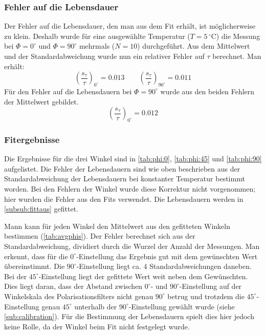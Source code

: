 \subsubsection{Fehler auf die Lebensdauer}
Der Fehler auf die Lebensdauer, den man aus dem Fit erhält, ist möglicherweise zu klein. Deshalb wurde für eine ausgewählte Temperatur ($T=5\,{}^\circ$C) 
die Messung bei $\Phi=0^\circ$ und $\Phi=90^\circ$ mehrmals ($N=10$) durchgeführt. Aus dem Mittelwert und der Standardabweichung wurde 
nun ein relativer Fehler auf $\tau$ berechnet. Man erhält:
\begin{equation}
  \label{eq:error:tau:0_90}
  \left( \frac{s_\tau}{\tau} \right)_{0^\circ} = 0.013 \qquad \left( \frac{s_\tau}{\tau} \right)_{90^\circ} = 0.011
\end{equation}
Für den Fehler auf die Lebensdauern bei $\Phi=90^\circ$ wurde aus den beiden Fehlern der Mittelwert gebildet.
\begin{equation}
  \label{eq:error:tau:45}
  \left( \frac{s_\tau}{\tau} \right)_{0^\circ} = 0.012
\end{equation}
\subsubsection{Fitergebnisse}
\label{subsub:fitresults}
Die Ergebnisse für die drei Winkel sind in \autoref{tab:phi:0}, \autoref{tab:phi:45} und \autoref{tab:phi:90} aufgelistet. Die Fehler der 
Lebensdauern sind wie oben beschrieben aus der Standardabweichung der Lebensdauern bei konstanter Temperatur bestimmt worden. Bei den Fehlern 
der Winkel wurde diese Korrektur nicht vorgenommen; hier wurden die Fehler aus den Fits verwendet. Die Lebensdauern werden in 
\ref{subsub:fittaus} gefittet.




Mann kann für jeden Winkel den Mittelwert aus den gefitteten Winkeln bestimmen (\autoref{tab:avgphis}). Der Fehler berechnet sich aus der 
Standardabweichung, dividiert durch die Wurzel der Anzahl der Messungen. Man erkennt, dass für die $0^\circ$-Einstellung das Ergebnis gut mit dem 
gewünschten Wert übereinstimmt. Die $90^\circ$-Einstellung liegt ca. 4 Standardabweichungen daneben. Bei der $45^\circ$-Einstellung liegt der 
gefittete Wert weit neben dem Gewünschten. Dies liegt daran, dass der Abstand zwischen $0^\circ$- und $90^\circ$-Einstellung auf der Winkelskala 
des Polarisationsfilters nicht genau $90^\circ$ betrug und trotzdem die $45^\circ$-Einstellung genau $45^\circ$ unterhalb der $90^\circ$-Einstellung 
gewählt wurde (siehe \ref{sub:calibration}). Für die Bestimmung der Lebensdauern spielt dies hier jedoch keine Rolle, da der Winkel beim Fit 
nicht festgelegt wurde.


